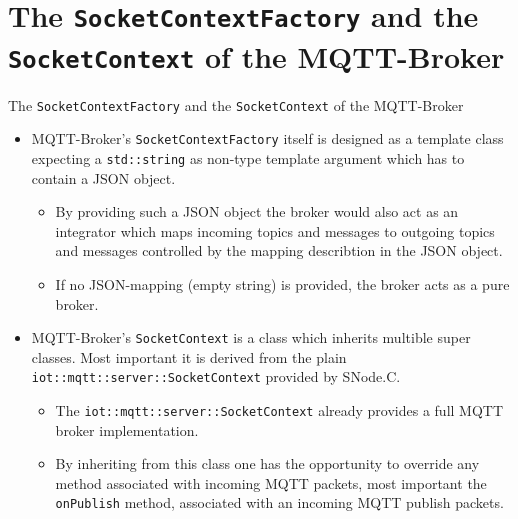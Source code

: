 \section[nosectionpage]{The \texttt{SocketContextFactory} and the \texttt{SocketContext} of the MQTT-Broker}

\begin{frame}[fragile]{The \texttt{SocketContextFactory} and the \texttt{SocketContext} of the MQTT-Broker}
  \begin{itemize}
    \item \textcolor{fh-ooe-red}{MQTT-Broker}'s \textcolor{fh-ooe-red}{\texttt{SocketContextFactory}} itself is designed as a \textcolor{fh-ooe-red}{template class} expecting a \textcolor{fh-ooe-red}{\texttt{std::string}} as \textcolor{fh-ooe-red}{non-type template argument} which has to contain a \textcolor{fh-ooe-red}{JSON} object.
    \begin{itemize}
      \item By \textcolor{fh-ooe-red}{providing} such a \textcolor{fh-ooe-red}{JSON} object the \textcolor{fh-ooe-red}{broker} would \textcolor{fh-ooe-red}{also} act as an \textcolor{fh-ooe-red}{integrator} which \textcolor{fh-ooe-red}{maps incoming topics and messages} to \textcolor{fh-ooe-red}{outgoing topics and messages controlled} by the \textcolor{fh-ooe-red}{mapping describtion in the JSON} object.
      \item If \textcolor{fh-ooe-red}{no JSON}-mapping (empty string) is provided, the broker acts as a \textcolor{fh-ooe-red}{pure broker}.
    \end{itemize}
    \item \textcolor{fh-ooe-red}{MQTT-Broker}'s \textcolor{fh-ooe-red}{\texttt{SocketContext}} is a class which \textcolor{fh-ooe-red}{inherits multible super classes}. Most \textcolor{fh-ooe-red}{important} it is \textcolor{fh-ooe-red}{derived from} the plain \textcolor{fh-ooe-red}{\texttt{iot::mqtt::server::SocketContext}} provided by SNode.C.
    \begin{itemize}
      \item The \textcolor{fh-ooe-red}{\texttt{iot::mqtt::server::SocketContext} already provides a full MQTT broker} implementation.
      \item By \textcolor{fh-ooe-red}{inheriting from this class} one has the \textcolor{fh-ooe-red}{opportunity} to \textcolor{fh-ooe-red}{override any method associated with incoming MQTT packets}, most \textcolor{fh-ooe-red}{important} the \textcolor{fh-ooe-red}{\texttt{onPublish}} method, \textcolor{fh-ooe-red}{associated} with an incoming \textcolor{fh-ooe-red}{MQTT publish packets}.


\end{itemize}
\end{itemize}
\end{frame}
